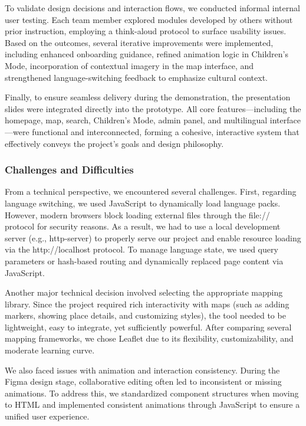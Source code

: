 To validate design decisions and interaction flows, we conducted informal internal user testing. Each team member explored modules developed by others without prior instruction, employing a think-aloud protocol to surface usability issues. Based on the outcomes, several iterative improvements were implemented, including enhanced onboarding guidance, refined animation logic in Children’s Mode, incorporation of contextual imagery in the map interface, and strengthened language-switching feedback to emphasize cultural context.

Finally, to ensure seamless delivery during the demonstration, the presentation slides were integrated directly into the prototype. All core features—including the homepage, map, search, Children’s Mode, admin panel, and multilingual interface—were functional and interconnected, forming a cohesive, interactive system that effectively conveys the project's goals and design philosophy.

\subsubsection{Challenges and Difficulties}

From a technical perspective, we encountered several challenges. First, regarding language switching, we used JavaScript to dynamically load language packs. However, modern browsers block loading external files through the file:// protocol for security reasons. As a result, we had to use a local development server (e.g., http-server) to properly serve our project and enable resource loading via the http://localhost protocol. To manage language state, we used query parameters or hash-based routing and dynamically replaced page content via JavaScript.

Another major technical decision involved selecting the appropriate mapping library. Since the project required rich interactivity with maps (such as adding markers, showing place details, and customizing styles), the tool needed to be lightweight, easy to integrate, yet sufficiently powerful. After comparing several mapping frameworks, we chose Leaflet due to its flexibility, customizability, and moderate learning curve.

We also faced issues with animation and interaction consistency. During the Figma design stage, collaborative editing often led to inconsistent or missing animations. To address this, we standardized component structures when moving to HTML and implemented consistent animations through JavaScript to ensure a unified user experience.

